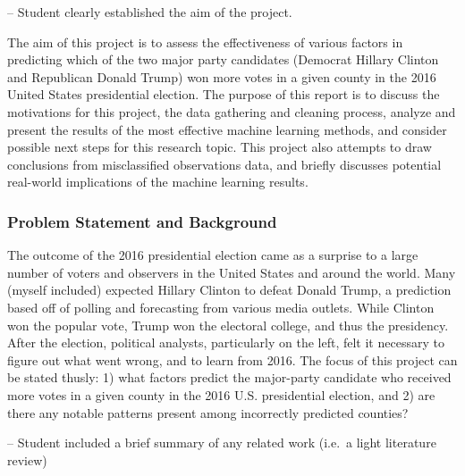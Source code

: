 \documentclass[11pt]{article}
\begin{document}
-- Student clearly established the aim of the project.

The aim of this project is to assess the effectiveness of various
factors in predicting which of the two major party candidates (Democrat
Hillary Clinton and Republican Donald Trump) won more votes in a given
county in the 2016 United States presidential election. The purpose of
this report is to discuss the motivations for this project, the data
gathering and cleaning process, analyze and present the results of the
most effective machine learning methods, and consider possible next
steps for this research topic. This project also attempts to draw
conclusions from misclassified observations data, and briefly discusses
potential real-world implications of the machine learning results.

    \hypertarget{problem-statement-and-background}{%
\subsubsection{Problem Statement and
Background}\label{problem-statement-and-background}}

The outcome of the 2016 presidential election came as a surprise to a
large number of voters and observers in the United States and around the
world. Many (myself included) expected Hillary Clinton to defeat Donald
Trump, a prediction based off of polling and forecasting from various
media outlets. While Clinton won the popular vote, Trump won the
electoral college, and thus the presidency. After the election,
political analysts, particularly on the left, felt it necessary to
figure out what went wrong, and to learn from 2016. The focus of this
project can be stated thusly: 1) what factors predict the major-party
candidate who received more votes in a given county in the 2016 U.S.
presidential election, and 2) are there any notable patterns present
among incorrectly predicted counties?

    -- Student included a brief summary of any related work (i.e.~a light
literature review)
\end{document}
